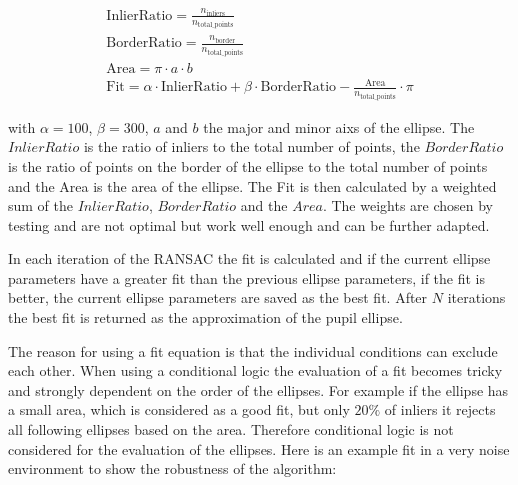 \begin{gather}
    \text{InlierRatio} = \frac{n_{\text{inliers}}}{n_{\text{total\_points}}} \\
    \text{BorderRatio} = \frac{n_{\text{border}}}{n_{\text{total\_points}}} \\
    \text{Area} = \pi \cdot a \cdot b \\
    \text{Fit} = \alpha \cdot \text{InlierRatio} + \beta \cdot \text{BorderRatio} - \frac{\text{Area}}{n_{\text{total\_points}}} \cdot \pi
\end{gather}

with $\alpha = 100$, $\beta = 300$, $a$ and $b$ the major and minor aixs of the ellipse. The $InlierRatio$ is the ratio of inliers to the total number of points, the $BorderRatio$ is the ratio of points on the border of the ellipse to the total number of points and the Area is the area of the ellipse. The Fit is then calculated by a weighted sum of the $InlierRatio$, $BorderRatio$ and the $Area$. The weights are chosen by testing and are not optimal but work well enough and can be further adapted. 

In each iteration of the RANSAC the fit is calculated and if the current ellipse parameters have a greater fit than the previous ellipse parameters, if the fit is better, the current ellipse parameters are saved as the best fit. After $N$ iterations the best fit is returned as the approximation of the pupil ellipse. 

The reason for using a fit equation is that the individual conditions can exclude each other. When using a conditional logic the evaluation of a fit becomes tricky and strongly dependent on the order of the ellipses.  For example if the ellipse has a small area, which is considered as a good fit, but only $20\%$ of inliers it rejects all following ellipses based on the area. Therefore conditional logic is not considered for the evaluation of the ellipses. 
Here is an example fit in a very noise environment to show the robustness of the algorithm: 

